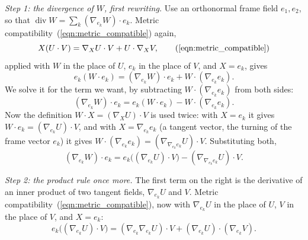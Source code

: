 \emph{Step 1: the divergence of $W$, first rewriting.} Use an orthonormal frame field $e_1, e_2$, so that $\operatorname{div} W = \sum_k (\nabla_{e_k} W)\cdot e_k$. Metric compatibility~(\ref{eqn:metric_compatible}) again,
\begin{equation*}
X(U\cdot V) = \nabla_X U\cdot V + U\cdot\nabla_X V , \tag{\ref{eqn:metric_compatible}}
\end{equation*}
applied with $W$ in the place of $U$, $e_k$ in the place of $V$, and $X = e_k$, gives
\begin{equation*}
e_k(W\cdot e_k) = (\nabla_{e_k} W)\cdot e_k + W \cdot (\nabla_{e_k} e_k) .
\end{equation*}
We solve it for the term we want, by subtracting $W\cdot(\nabla_{e_k} e_k)$ from both sides:
\begin{equation*}
(\nabla_{e_k} W)\cdot e_k = e_k(W\cdot e_k) - W\cdot(\nabla_{e_k} e_k) .
\end{equation*}
Now the definition $W\cdot X = (\nabla_X U)\cdot V$ is used twice: with $X = e_k$ it gives $W\cdot e_k = (\nabla_{e_k} U)\cdot V$, and with $X = \nabla_{e_k} e_k$ (a tangent vector, the turning of the frame vector $e_k$) it gives $W\cdot(\nabla_{e_k} e_k) = (\nabla_{\nabla_{e_k} e_k} U)\cdot V$. Substituting both,
\begin{equation*}
(\nabla_{e_k} W)\cdot e_k = e_k\big((\nabla_{e_k} U)\cdot V\big) - (\nabla_{\nabla_{e_k} e_k} U)\cdot V .
\end{equation*}

\emph{Step 2: the product rule once more.} The first term on the right is the derivative of an inner product of two tangent fields, $\nabla_{e_k} U$ and $V$. Metric compatibility~(\ref{eqn:metric_compatible}), now with $\nabla_{e_k} U$ in the place of $U$, $V$ in the place of $V$, and $X = e_k$:
\begin{equation*}
e_k\big((\nabla_{e_k} U)\cdot V\big) = (\nabla_{e_k}\nabla_{e_k} U)\cdot V + (\nabla_{e_k} U) \cdot (\nabla_{e_k} V) .
\end{equation*}

